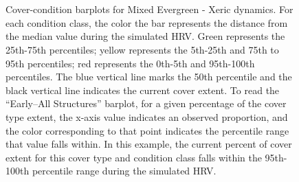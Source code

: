 \begin{figure}[!htbp]
  \\%
  \\%
    \\%
    \\%
    \\%
    \\%
    \\%
  \caption{Cover-condition barplots for Mixed Evergreen - Xeric dynamics. For each condition class, the color the bar represents the distance from the median value during the simulated HRV. Green represents the 25th-75th percentiles; yellow represents the 5th-25th and 75th to 95th percentiles; red represents the 0th-5th and 95th-100th percentiles. The blue vertical line marks the 50th percentile and the black vertical line indicates the current cover extent. To read the ``Early–All Structures'' barplot, for a given percentage of the cover type extent, the x-axis value indicates an observed proportion, and the color corresponding to that point indicates the percentile range that value falls within. In this example, the current percent of cover extent for this cover type and condition class falls within the 95th-100th percentile range during the simulated HRV.}
  \label{fig:covcondbar_megx}
\end{figure}

